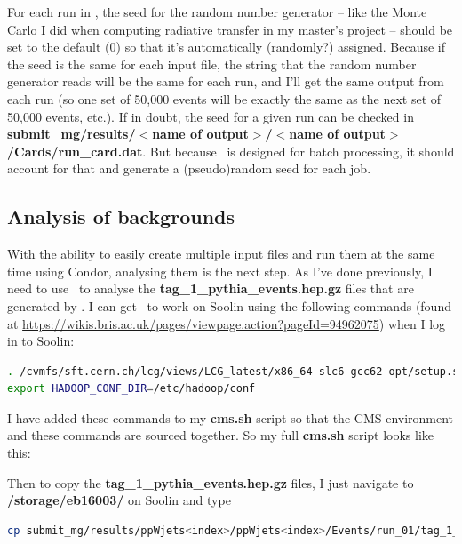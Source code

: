 For each run in \madgraph, the seed for the random number generator -- like the Monte Carlo I did when computing radiative transfer in my master's project -- should be set to the default (0) so that it's automatically (randomly?) assigned. Because if the seed is the same for each input file, the string that the random number generator reads will be the same for each run, and I'll get the same output from each run (so one set of 50,000 events will be exactly the same as the next set of 50,000 events, etc.). If in doubt, the seed for a given run can be checked in \textbf{submit\_mg/results/$<$name of output$>$/$<$name of output$>$/Cards/run\_card.dat}. But because \madgraph\ is designed for batch processing, it should account for that and generate a (pseudo)random seed for each job.

\subsection{Analysis of backgrounds}

With the ability to easily create multiple input files and run them at the same time using Condor, analysing them is the next step. As I've done previously, I need to use \madanalysis\ to analyse the \textbf{tag\_1\_pythia\_events.hep.gz} files that are generated by \madgraph. I can get \madanalysis\ to work on Soolin using the following commands (found at \url{https://wikis.bris.ac.uk/pages/viewpage.action?pageId=94962075}) when I log in to Soolin:

\begin{lstlisting}[belowskip=-0.7cm, language=sh, numbers=none]
. /cvmfs/sft.cern.ch/lcg/views/LCG_latest/x86_64-slc6-gcc62-opt/setup.sh}
export HADOOP_CONF_DIR=/etc/hadoop/conf
\end{lstlisting}

I have added these commands to my \textbf{cms.sh} script so that the CMS environment and these commands are sourced together. So my full \textbf{cms.sh} script looks like this:



Then to copy the \textbf{tag\_1\_pythia\_events.hep.gz} files, I just navigate to \textbf{/storage/eb16003/} on Soolin and type

\begin{lstlisting}[belowskip=-0.7cm, language=sh, numbers=none]
cp submit_mg/results/ppWjets<index>/ppWjets<index>/Events/run_01/tag_1_pythia_events.hep.gz MadAnalysis/MA5_v1_4/Input/ppWjets<index>.hep.gz
\end{lstlisting}

